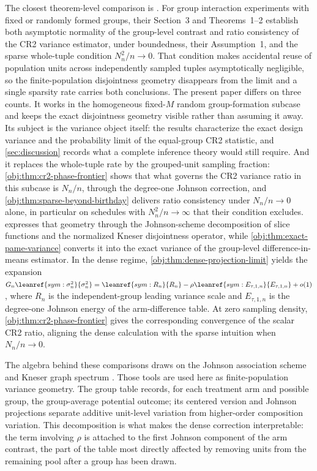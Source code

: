 The closest theorem-level comparison is \citet{FuSamiiWang2026}. For group interaction experiments with fixed or randomly formed groups, their Section~3 and Theorems~1--2 establish both asymptotic normality of the group-level contrast and ratio consistency of the CR2 variance estimator, under boundedness, their Assumption~1, and the sparse whole-tuple condition \(N_n^2/n\to0\). That condition makes accidental reuse of population units across independently sampled tuples asymptotically negligible, so the finite-population disjointness geometry disappears from the limit and a single sparsity rate carries both conclusions. The present paper differs on three counts. It works in the homogeneous fixed-\(M\) random group-formation subcase and keeps the exact disjointness geometry visible rather than assuming it away. Its subject is the variance object itself: the results characterize the exact design variance and the probability limit of the equal-group CR2 statistic, and \cref{sec:discussion} records what a complete inference theory would still require. And it replaces the whole-tuple rate by the grouped-unit sampling fraction: \cref{obj:thm:cr2-phase-frontier} shows that what governs the CR2 variance ratio in this subcase is \(N_n/n\), through the degree-one Johnson correction, and \cref{obj:thm:sparse-beyond-birthday} delivers ratio consistency under \(N_n/n\to0\) alone, in particular on schedules with \(N_n^2/n\to\infty\) that their condition excludes.  expresses that geometry through the Johnson-scheme decomposition of slice functions and the normalized Kneser disjointness operator, while \cref{obj:thm:exact-pame-variance} converts it into the exact variance of the group-level difference-in-means estimator. In the dense regime, \cref{obj:thm:dense-projection-limit} yields the expansion \(G_n\leanref{sym:\sigma_n^2}{\ensuremath{\sigma_n^2}}=\leanref{sym:R_n}{\ensuremath{R_n}}-\rho \leanref{sym:E_{\tau,1,n}}{\ensuremath{E_{\tau,1,n}}}+o(1)\), where \(R_n\) is the independent-group leading variance scale and \(E_{\tau,1,n}\) is the degree-one Johnson energy of the arm-difference table. At zero sampling density, \cref{obj:thm:cr2-phase-frontier} gives the corresponding convergence of the scalar CR2 ratio, aligning the dense calculation with the sparse intuition when \(N_n/n\to0\).

The algebra behind these comparisons draws on the Johnson association scheme and Kneser graph spectrum \citep{Delsarte1973,BrouwerCohenNeumaier1989,Filmus2016,BrouwerEtAl2018}. Those tools are used here as finite-population variance geometry. The group table  records, for each treatment arm and possible group, the group-average potential outcome; its centered version and Johnson projections separate additive unit-level variation from higher-order composition variation. This decomposition is what makes the dense correction interpretable: the term involving \(\rho\) is attached to the first Johnson component of the arm contrast, the part of the table most directly affected by removing units from the remaining pool after a group has been drawn.

